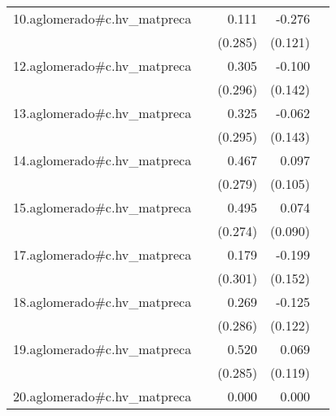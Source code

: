 {\begin{longtable}{l*{4}{D{.}{.}{-1}}}
\addlinespace
10.aglomerado#c.hv\_matpreca&                     &       0.111         &      -0.276\sym{*}  &                     \\
            &                     &     (0.285)         &     (0.121)         &                     \\
\addlinespace
12.aglomerado#c.hv\_matpreca&                     &       0.305         &      -0.100         &                     \\
            &                     &     (0.296)         &     (0.142)         &                     \\
\addlinespace
13.aglomerado#c.hv\_matpreca&                     &       0.325         &      -0.062         &                     \\
            &                     &     (0.295)         &     (0.143)         &                     \\
\addlinespace
14.aglomerado#c.hv\_matpreca&                     &       0.467         &       0.097         &                     \\
            &                     &     (0.279)         &     (0.105)         &                     \\
\addlinespace
15.aglomerado#c.hv\_matpreca&                     &       0.495         &       0.074         &                     \\
            &                     &     (0.274)         &     (0.090)         &                     \\
\addlinespace
17.aglomerado#c.hv\_matpreca&                     &       0.179         &      -0.199         &                     \\
            &                     &     (0.301)         &     (0.152)         &                     \\
\addlinespace
18.aglomerado#c.hv\_matpreca&                     &       0.269         &      -0.125         &                     \\
            &                     &     (0.286)         &     (0.122)         &                     \\
\addlinespace
19.aglomerado#c.hv\_matpreca&                     &       0.520         &       0.069         &                     \\
            &                     &     (0.285)         &     (0.119)         &                     \\
\addlinespace
20.aglomerado#c.hv\_matpreca&                     &       0.000         &       0.000         &                     \\

\end{longtable}}
